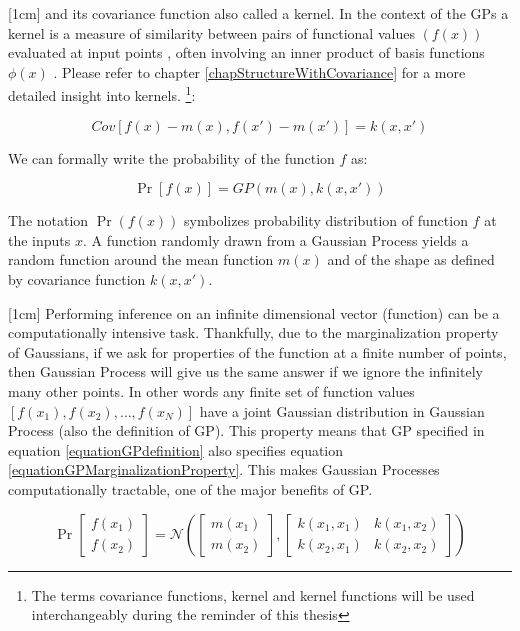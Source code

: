 [1cm]
and its covariance function also called a kernel. In the context of the GPs a kernel is a measure of similarity between pairs of functional values \((f(x))\) evaluated at input points , often involving an inner product of basis functions \(\phi(x)\) \cite{bishop2006pattern}. Please refer to chapter \ref{chapStructureWithCovariance} for a more detailed insight into kernels.   \footnote{The terms covariance functions, kernel and kernel functions will be used interchangeably during the reminder of this thesis}:

\begin{equation}\label{eq:covarianceGP}
Cov[f(x) - m(x), f(x') - m(x')] = k(x, x')
\end{equation}

We can formally write the probability of the function \(f\) as:

\begin{equation}\label{equationGPdefinition}
\Pr[f(x)] = GP(m(x), k(x, x'))
\end{equation}

The notation \(\Pr(f( x))\) symbolizes probability distribution of function \(f\) at the inputs \(x\). A function randomly drawn from a Gaussian Process yields a random function around the mean function \(m(x)\) and of the shape as defined by covariance function \(k(x, x')\). 

[1cm]
Performing inference on an infinite dimensional vector (function) can be a computationally intensive task. Thankfully, due to the marginalization property of Gaussians, if we ask for properties of the function at a finite number of points, then  Gaussian Process will give us the same answer if we ignore the infinitely many other points. In other words any finite set of function values \([f(x_{1}), f(x_{2}), \ldots, f(x_{N})]\) have a joint Gaussian distribution in Gaussian Process (also the  definition of GP). This property means that GP specified in equation \ref{equationGPdefinition} also specifies equation \ref{equationGPMarginalizationProperty}. This makes Gaussian Processes computationally tractable, one of the major benefits of GP. 


\begin{equation}\label{equationGPMarginalizationProperty}
\Pr\left [ \begin{matrix}
f(x_{1})
\\ f(x_{2})
\end{matrix} \right ] = \mathcal{N}\left (\left [ \begin{matrix}
m(x_{1})
\\ m(x_{2})

\end{matrix} \right ] , \left [ \begin{matrix}
k(x_{1}, x_{1}) & k(x_{1}, x_{2})\\ 
k(x_{2}, x_{1}) & k(x_{2}, x_{2})
\end{matrix} \right ] \right )
\end{equation}

